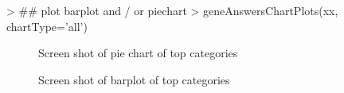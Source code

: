 \documentclass[a4paper]{article}
\begin{document}
\begin{Schunk}
\begin{Sinput}
> ## plot barplot and / or piechart
> geneAnswersChartPlots(xx, chartType='all')
\end{Sinput}
\end{Schunk}

\begin{figure}
\centering
\centering
{}
\caption{Screen shot of pie chart of top categories}
\label{pie chart of top categories}
\end{figure}

\begin{figure}
\centering
\centering
{}
\caption{Screen shot of barplot of top categories}
\label{barplot of top categories}
\end{figure}   
\end{document}
